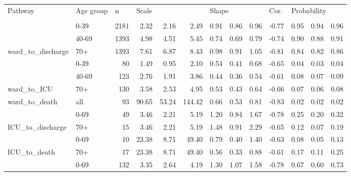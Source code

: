 
\begin{tabular}[t]{llrrrrrrrrrrr}
\toprule
\multicolumn{1}{l}{Pathway} & \multicolumn{1}{l}{Age group} & \multicolumn{1}{l}{n} & \multicolumn{3}{l}{Scale} & \multicolumn{3}{l}{Shape} & \multicolumn{1}{l}{Cor.} & \multicolumn{3}{l}{Probability} \\
\cmidrule(l{3pt}r{3pt}){1-1} \cmidrule(l{3pt}r{3pt}){2-2} \cmidrule(l{3pt}r{3pt}){3-3} \cmidrule(l{3pt}r{3pt}){4-6} \cmidrule(l{3pt}r{3pt}){7-9} \cmidrule(l{3pt}r{3pt}){10-10} \cmidrule(l{3pt}r{3pt}){11-13}
 &  &  &  &  &  &  &  &  &  &  &  & \\
\midrule
 & 0-39 & 2181 & 2.32 & 2.16 & 2.49 & 0.91 & 0.86 & 0.96 & -0.77 & 0.95 & 0.94 & 0.96\\
\cmidrule{2-13}
 & 40-69 & 1393 & 4.98 & 4.51 & 5.45 & 0.74 & 0.69 & 0.79 & -0.74 & 0.90 & 0.88 & 0.91\\
\cmidrule{2-13}
\multirow{-3}{*}{\raggedright\arraybackslash ward\_to\_discharge} & 70+ & 1393 & 7.61 & 6.87 & 8.43 & 0.98 & 0.91 & 1.05 & -0.81 & 0.84 & 0.82 & 0.86\\
\cmidrule{1-13}
 & 0-39 & 80 & 1.49 & 0.95 & 2.10 & 0.54 & 0.41 & 0.68 & -0.65 & 0.04 & 0.03 & 0.04\\
\cmidrule{2-13}
 & 40-69 & 123 & 2.76 & 1.91 & 3.86 & 0.44 & 0.36 & 0.54 & -0.61 & 0.08 & 0.07 & 0.09\\
\cmidrule{2-13}
\multirow{-3}{*}{\raggedright\arraybackslash ward\_to\_ICU} & 70+ & 130 & 3.58 & 2.53 & 4.95 & 0.53 & 0.43 & 0.64 & -0.66 & 0.07 & 0.06 & 0.08\\
\cmidrule{1-13}
ward\_to\_death & all & 93 & 90.65 & 53.24 & 144.42 & 0.66 & 0.53 & 0.81 & -0.83 & 0.02 & 0.02 & 0.02\\
\cmidrule{1-13}
 & 0-69 & 49 & 3.46 & 2.21 & 5.19 & 1.20 & 0.84 & 1.67 & -0.78 & 0.25 & 0.20 & 0.32\\
\cmidrule{2-13}
\multirow{-2}{*}{\raggedright\arraybackslash ICU\_to\_discharge} & 70+ & 15 & 3.46 & 2.21 & 5.19 & 1.48 & 0.91 & 2.29 & -0.65 & 0.12 & 0.07 & 0.19\\
\cmidrule{1-13}
 & 0-69 & 10 & 23.38 & 8.71 & 49.40 & 0.79 & 0.40 & 1.40 & -0.63 & 0.08 & 0.05 & 0.13\\
\cmidrule{2-13}
\multirow{-2}{*}{\raggedright\arraybackslash ICU\_to\_death} & 70+ & 17 & 23.38 & 8.71 & 49.40 & 0.56 & 0.33 & 0.88 & -0.61 & 0.17 & 0.11 & 0.25\\
\cmidrule{1-13}
 & 0-69 & 132 & 3.35 & 2.64 & 4.19 & 1.30 & 1.07 & 1.58 & -0.78 & 0.67 & 0.60 & 0.73\\
\cmidrule{2-13}

\end{tabular}
